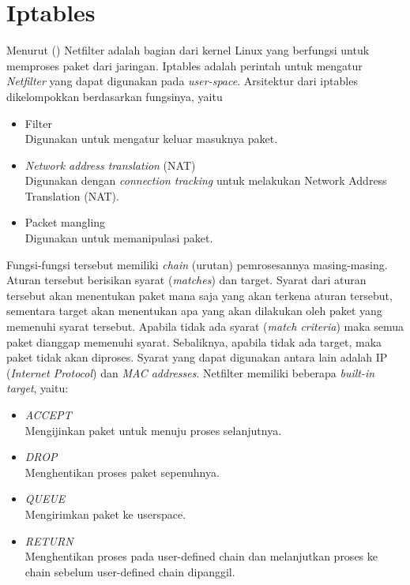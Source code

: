 \section{Iptables}

Menurut (\cite{purdy2004linux}) Netfilter adalah bagian dari kernel Linux yang berfungsi untuk memproses paket dari jaringan. Iptables adalah perintah untuk mengatur \textit{Netfilter} yang dapat digunakan pada \textit{user-space}. Arsitektur dari iptables dikelompokkan berdasarkan fungsinya, yaitu
\begin{itemize}
	\item Filter\\
	Digunakan untuk mengatur keluar masuknya paket.
	\item \textit{Network address translation} (NAT)\\
	Digunakan dengan \textit{connection tracking} untuk melakukan Network Address Translation (NAT).
	\item Packet mangling\\
	Digunakan untuk memanipulasi paket.	
\end{itemize} 

Fungsi-fungsi tersebut memiliki \textit{chain} (urutan) pemrosesannya masing-masing. Aturan tersebut berisikan syarat (\textit{matches}) dan target. Syarat dari aturan tersebut akan menentukan paket mana saja yang akan terkena aturan tersebut, sementara target akan menentukan apa yang akan dilakukan oleh paket yang memenuhi syarat tersebut. Apabila tidak ada syarat (\textit{match criteria}) maka semua paket dianggap memenuhi syarat. Sebaliknya, apabila tidak ada target, maka paket tidak akan diproses. Syarat yang dapat digunakan antara lain adalah IP (\textit{Internet Protocol}) dan \textit{MAC addresses}.
Netfilter memiliki beberapa \textit{built-in target}, yaitu:
\begin{itemize}
	\item \textit{ACCEPT}\\
	Mengijinkan paket untuk menuju proses selanjutnya.
	\item \textit{DROP}\\
	Menghentikan proses paket sepenuhnya.
	\item \textit{QUEUE}\\
	Mengirimkan paket ke userspace.
	\item \textit{RETURN}\\
	Menghentikan proses pada user-defined chain dan melanjutkan proses ke chain sebelum user-defined chain dipanggil.
\end{itemize}
